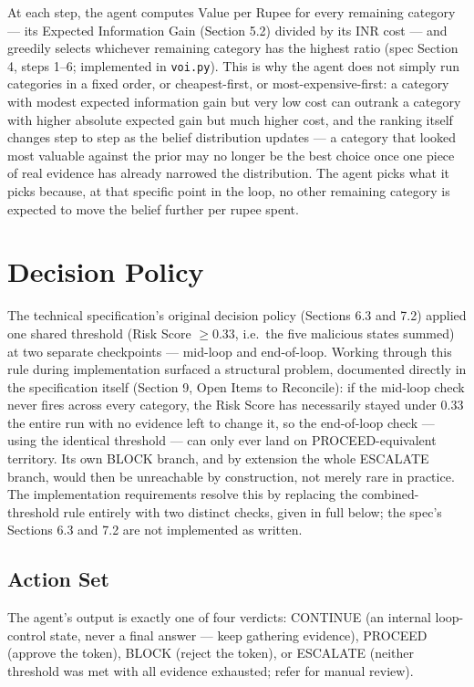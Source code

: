 \documentclass[11pt]{article}
\begin{document}
At each step, the agent computes Value per Rupee for every remaining category --- its Expected Information Gain (Section 5.2) divided by its INR cost --- and greedily selects whichever remaining category has the highest ratio (spec Section 4, steps 1--6; implemented in \texttt{voi.py}). This is why the agent does not simply run categories in a fixed order, or cheapest-first, or most-expensive-first: a category with modest expected information gain but very low cost can outrank a category with higher absolute expected gain but much higher cost, and the ranking itself changes step to step as the belief distribution updates --- a category that looked most valuable against the prior may no longer be the best choice once one piece of real evidence has already narrowed the distribution. The agent picks what it picks because, at that specific point in the loop, no other remaining category is expected to move the belief further per rupee spent.

\section{Decision Policy}

The technical specification's original decision policy (Sections 6.3 and 7.2) applied one shared threshold (Risk Score $\geq 0.33$, i.e.\ the five malicious states summed) at two separate checkpoints --- mid-loop and end-of-loop. Working through this rule during implementation surfaced a structural problem, documented directly in the specification itself (Section 9, Open Items to Reconcile): if the mid-loop check never fires across every category, the Risk Score has necessarily stayed under 0.33 the entire run with no evidence left to change it, so the end-of-loop check --- using the identical threshold --- can only ever land on PROCEED-equivalent territory. Its own BLOCK branch, and by extension the whole ESCALATE branch, would then be unreachable by construction, not merely rare in practice. The implementation requirements resolve this by replacing the combined-threshold rule entirely with two distinct checks, given in full below; the spec's Sections 6.3 and 7.2 are not implemented as written.

\subsection{Action Set}

The agent's output is exactly one of four verdicts: CONTINUE (an internal loop-control state, never a final answer --- keep gathering evidence), PROCEED (approve the token), BLOCK (reject the token), or ESCALATE (neither threshold was met with all evidence exhausted; refer for manual review).
\end{document}
